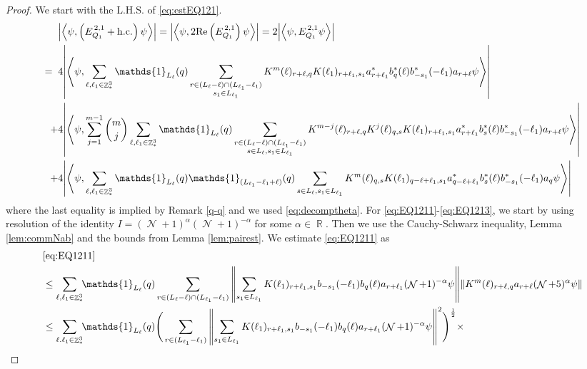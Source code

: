 \documentclass[sn-mathphys, Numbered ,a4paper]{sn-jnl}%
\DeclareMathOperator{\R}{\mathbb{R}}
\DeclareMathOperator{\Z}{\mathbb{Z}}
\DeclareMathOperator{\NN}{\mathcal{N}}
\newcommand{\half}{\frac{1}{2}}
\newcommand{\eva}[1]{\left\langle #1 \right\rangle}
\theoremstyle{plain}
\theoremstyle{definition}
\theoremstyle{remark}
\theoremstyle{plain}
\theoremstyle{definition}
\theoremstyle{remark}
\begin{document}
\begin{proof}
We start with the L.H.S. of \eqref{eq:estEQ121}.
\begin{align}
	&\abs{\eva{\psi,\left(E^{\,2,1}_{Q_1}+\mathrm{h.c.}\right) \psi }} = \abs{\eva{\psi,2\mathrm{Re}\left(E^{\,2,1}_{Q_1}\right) \psi }} = 2\abs{\eva{\psi, E^{\,2,1}_{Q_1} \psi }}\nonumber\\
	=\;\;&4  \abs{\eva{\psi, \sum\limits_{\ell, \ell_1\in \Z^3_*} \mathds{1}_{L_{\ell}}(q) \sum\limits_{\substack{r\in (L_{\ell}-\ell) \cap (L_{\ell_1}-\ell_1)\\ s_1\in L_{\ell_1} }} K^m(\ell )_{r+\ell,q}K(\ell_1)_{r+\ell_1,s_1}
	a^*_{r+\ell_1} b^*_{q}(\ell) b^*_{-s_1}(-\ell_1)a_{r+\ell} \psi }} \label{eq:EQ1211}\\
	\;+&4   \abs{\eva{\psi, \sum\limits_{j=1}^{m-1} {{m}\choose j} \sum\limits_{\ell, \ell_1\in \Z^3_*}\mathds{1}_{L_{\ell}}(q) \sum\limits_{\substack{r\in (L_{\ell}-\ell) \cap (L_{\ell_1}-\ell_1)\\ s \in L_{\ell},s_1\in L_{\ell_1} }} K^{m-j}(\ell)_{r+\ell,q} K^{j}(\ell)_{q,s} K(\ell_1)_{r+\ell_1,s_1} a^*_{r+\ell_1} b^*_{s}(\ell) b^*_{-s_1}(-\ell_1) a_{r+\ell} \psi }} \label{eq:EQ1212}\\
	\;+&4\abs{\eva{\psi, \sum\limits_{\ell, \ell_1\in \Z^3_*} \mathds{1}_{L_{\ell}}(q) \mathds{1}_{(L_{\ell_1}-\ell_1+\ell)}(q) \sum\limits_{s \in L_{\ell},s_1\in L_{\ell_1}}  K^m(\ell)_{q,s} K(\ell_1)_{q-\ell+\ell_1,s_1} a^*_{q-\ell+\ell_1} b^*_{s}(\ell) b^*_{-s_1}(-\ell_1) a_{q} \psi }}\label{eq:EQ1213}
\end{align}
where the last equality is implied by Remark \ref{q-q} and we used \eqref{eq:decomptheta}.
For \eqref{eq:EQ1211}-\eqref{eq:EQ1213}, we start by using resolution of the identity $I = (\NN+1)^{\alpha}(\NN+1)^{-\alpha}$ for some $\alpha \in \R$. Then we use the Cauchy-Schwarz inequality, Lemma \ref{lem:commNab} and the bounds from Lemma \ref{lem:pairest}. We estimate \eqref{eq:EQ1211} as
\begin{align}
	&\eqref{eq:EQ1211}\nonumber\\
	&\leq\sum\limits_{\ell,\ell_1 \in \Z^3_*} \!\!\mathds{1}_{L_\ell}(q) \sum\limits_{ r \in (L_\ell-\ell) \cap (L_{\ell_1}-\ell_1)}    \norm{\sum\limits_{s_1 \in L_{\ell_1}} K(\ell_1)_{r+\ell_1,s_1} b_{-s_1}(-\ell_1) b_{q}(\ell) a_{r+\ell_1} (\NN+1)^{-\alpha}\psi}\norm{  K^{m}(\ell)_{r+\ell,q}  a_{r+\ell} (\NN+5)^{\alpha}\psi } \nonumber\\
	&\leq \sum\limits_{\ell.\ell_1 \in \Z^3_*} \!\!\mathds{1}_{L_\ell}(q) \Bigg( \sum\limits_{r \in (L_{\ell_1}-\ell_1)} \norm{\sum\limits_{s_1 \in L_{\ell_1}} K(\ell_1)_{r+\ell_1,s_1} b_{-s_1}(-\ell_1) b_{q}(\ell) a_{r+\ell_1} (\NN+1)^{-\alpha}\psi}^2\Bigg)^\half \times\nonumber\\

\end{align}
\end{proof}
\end{document}
